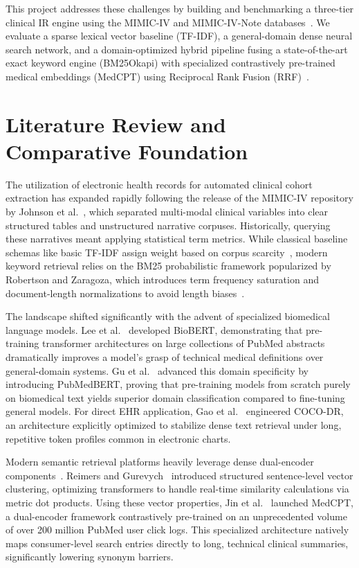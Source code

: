 \documentclass[conference]{IEEEtran}
\begin{document}
This project addresses these challenges by building and benchmarking a three-tier clinical IR engine using the MIMIC-IV and MIMIC-IV-Note databases~\cite{johnson2023mimic}. We evaluate a sparse lexical vector baseline (TF-IDF), a general-domain dense neural search network, and a domain-optimized hybrid pipeline fusing a state-of-the-art exact keyword engine (BM25Okapi) with specialized contrastively pre-trained medical embeddings (MedCPT) using Reciprocal Rank Fusion (RRF)~\cite{robertson2009probabilistic,jin2023medcpt,cormack2009reciprocal}.

\section{Literature Review and Comparative Foundation}
The utilization of electronic health records for automated clinical cohort extraction has expanded rapidly following the release of the MIMIC-IV repository by Johnson et al.~\cite{johnson2023mimic}, which separated multi-modal clinical variables into clear structured tables and unstructured narrative corpuses. Historically, querying these narratives meant applying statistical term metrics. While classical baseline schemas like basic TF-IDF assign weight based on corpus scarcity~\cite{salton1988term}, modern keyword retrieval relies on the BM25 probabilistic framework popularized by Robertson and Zaragoza, which introduces term frequency saturation and document-length normalizations to avoid length biases~\cite{robertson2009probabilistic}.

The landscape shifted significantly with the advent of specialized biomedical language models. Lee et al.~\cite{lee2020biobert} developed BioBERT, demonstrating that pre-training transformer architectures on large collections of PubMed abstracts dramatically improves a model's grasp of technical medical definitions over general-domain systems. Gu et al.~\cite{gu2021domain} advanced this domain specificity by introducing PubMedBERT, proving that pre-training models from scratch purely on biomedical text yields superior domain classification compared to fine-tuning general models. For direct EHR application, Gao et al.~\cite{gao2021cocodr} engineered COCO-DR, an architecture explicitly optimized to stabilize dense text retrieval under long, repetitive token profiles common in electronic charts.

Modern semantic retrieval platforms heavily leverage dense dual-encoder components~\cite{reimers2019sentence}. Reimers and Gurevych~\cite{reimers2019sentence} introduced structured sentence-level vector clustering, optimizing transformers to handle real-time similarity calculations via metric dot products. Using these vector properties, Jin et al.~\cite{jin2023medcpt} launched MedCPT, a dual-encoder framework contrastively pre-trained on an unprecedented volume of over 200 million PubMed user click logs. This specialized architecture natively maps consumer-level search entries directly to long, technical clinical summaries, significantly lowering synonym barriers.
\end{document}
